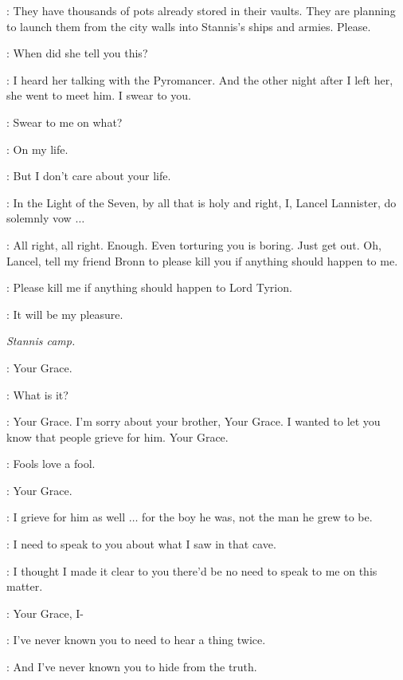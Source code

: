 \LANCEL: They have thousands of pots already stored in their vaults. They are planning to launch them from the city walls into Stannis's ships and armies. Please. 

\TYRION: When did she tell you this? 

\LANCEL: I heard her talking with the Pyromancer. And the other night after I left her, she went to meet him. I swear to you. 

\TYRION: Swear to me on what? 

\LANCEL: On my life. 

\TYRION: But I don't care about your life. 

\LANCEL: In the Light of the Seven, by all that is holy and right, I, Lancel Lannister, do solemnly vow $\ldots$  

\TYRION: All right, all right. Enough. Even torturing you is boring. Just get out. Oh, Lancel, tell my friend Bronn to please kill you if anything should happen to me. 


\LANCEL: Please kill me if anything should happen to Lord Tyrion. 

\BRONN: It will be my pleasure. 



\scene

\textit{Stannis camp.} 


\DAVOS: Your Grace. 

\STANNIS: What is it? 

\DAVOS: Your Grace. I'm sorry about your brother, Your Grace. I wanted to let you know that people grieve for him. Your Grace. 

\STANNIS: Fools love a fool. 

\DAVOS: Your Grace. 

\STANNIS: I grieve for him as well $\ldots$ for the boy he was, not the man he grew to be. 

\DAVOS: I need to speak to you about what I saw in that cave. 

\STANNIS: I thought I made it clear to you there'd be no need to speak to me on this matter. 

\DAVOS: Your Grace, I- 

\STANNIS: I've never known you to need to hear a thing twice. 

\DAVOS: And I've never known you to hide from the truth. 

